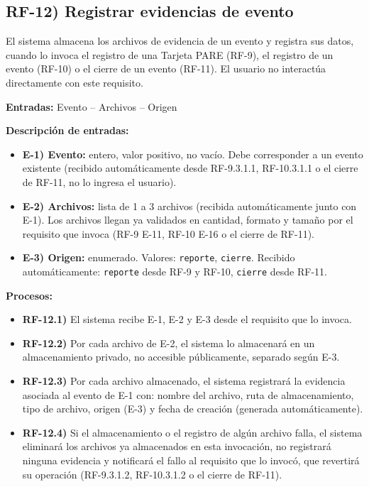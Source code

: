 \subsection*{RF-12) Registrar evidencias de evento}
El sistema almacena los archivos de evidencia de un evento y registra sus datos, cuando lo invoca el registro de una Tarjeta PARE (RF-9), el registro de un evento (RF-10) o el cierre de un evento (RF-11). El usuario no interact\'ua directamente con este requisito.

\textbf{Entradas:} Evento -- Archivos -- Origen

\textbf{Descripci\'on de entradas:}
\begin{itemize}[label={}, leftmargin=1.5em]
  \item \textbf{E-1) Evento:} entero, valor positivo, no vac\'io. Debe corresponder a un evento existente (recibido autom\'aticamente desde RF-9.3.1.1, RF-10.3.1.1 o el cierre de RF-11, no lo ingresa el usuario).
  \item \textbf{E-2) Archivos:} lista de 1 a 3 archivos (recibida autom\'aticamente junto con E-1). Los archivos llegan ya validados en cantidad, formato y tama\~no por el requisito que invoca (RF-9 E-11, RF-10 E-16 o el cierre de RF-11).
  \item \textbf{E-3) Origen:} enumerado. Valores: \texttt{reporte}, \texttt{cierre}. Recibido autom\'aticamente: \texttt{reporte} desde RF-9 y RF-10, \texttt{cierre} desde RF-11.
\end{itemize}

\textbf{Procesos:}
\begin{itemize}[label={}, leftmargin=1.5em]
  \item \textbf{RF-12.1)} El sistema recibe E-1, E-2 y E-3 desde el requisito que lo invoca.
  \item \textbf{RF-12.2)} Por cada archivo de E-2, el sistema lo almacenar\'a en un almacenamiento privado, no accesible p\'ublicamente, separado seg\'un E-3.
  \item \textbf{RF-12.3)} Por cada archivo almacenado, el sistema registrar\'a la evidencia asociada al evento de E-1 con: nombre del archivo, ruta de almacenamiento, tipo de archivo, origen (E-3) y fecha de creaci\'on (generada autom\'aticamente).
  \item \textbf{RF-12.4)} Si el almacenamiento o el registro de alg\'un archivo falla, el sistema eliminar\'a los archivos ya almacenados en esta invocaci\'on, no registrar\'a ninguna evidencia y notificar\'a el fallo al requisito que lo invoc\'o, que revertir\'a su operaci\'on (RF-9.3.1.2, RF-10.3.1.2 o el cierre de RF-11).
\end{itemize}

